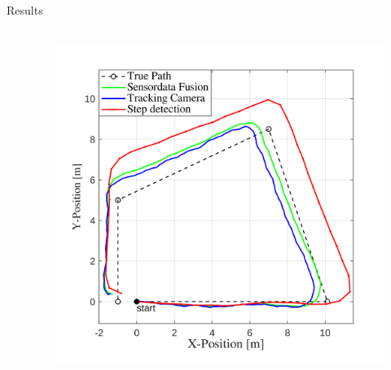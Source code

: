 \documentclass[aspectratio=169]{beamer}
\begin{document}
{\begin{frame}{Results}
\begin{columns}
\begin{column}{0.45\textwidth}
			\end{column}
			\begin{column}{0.54\textwidth}
				\begin{figure}
					\centering
					\includegraphics[width=0.9\linewidth]{../Conference_Paper/Path2}
				\end{figure}
				
			\end{column}
			
			
			
		\end{columns}
	\end{frame}
	

	

}
\end{document}

